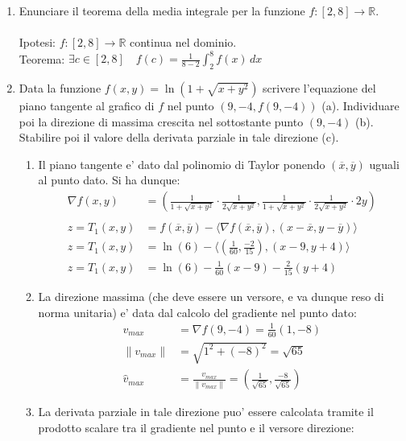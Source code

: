 \documentclass{article}
\begin{document}
\begin{enumerate}
  \item Enunciare il teorema della media integrale per la funzione $f: [2, 8] \to \mathbb{R}$. \\ \\
    Ipotesi: $f: [2, 8] \to \mathbb{R}$ continua nel dominio. \\
    Teorema: $\exists c \in [2, 8] \quad f(c) = \frac{1}{8-2} \int_2^8 f(x) \, dx$
  \item Data la funzione $f(x,y) = \ln(1+\sqrt{x+y^2})$ scrivere l'equazione del
    piano tangente al grafico di $f$ nel punto $(9, -4, f(9, -4))$ (a). Individuare
    poi la direzione di massima crescita nel sottostante punto $(9, -4)$ (b). Stabilire
    poi il valore della derivata parziale in tale direzione (c).
    \begin{enumerate}
      \item Il piano tangente e' dato dal polinomio di Taylor ponendo $(\overline{x},
        \overline{y})$ uguali al punto dato. Si ha dunque:
        \begin{align*}
          \nabla f(x,y) &= (\frac{1}{1+\sqrt{x+y^2}} \cdot \frac{1}{2\sqrt{x+y^2}}, \frac{1}{1+\sqrt{x+y^2}} \cdot \frac{1}{2\sqrt{x+y^2}} \cdot 2y) \\ \\
          z = T_1(x, y) &= f(\overline{x}, \overline{y}) - \langle \nabla f(\overline{x},
          \overline{y}), (x-\overline{x}, y-\overline{y}) \rangle \\
          z = T_1(x, y) &= \ln(6) - \langle (\frac{1}{60}, \frac{-2}{15}), (x-9, y+4) \rangle \\
          z = T_1(x, y) &= \ln(6) - \frac{1}{60}(x-9) - \frac{2}{15}(y+4)
        \end{align*}
      \item La direzione massima (che deve essere un versore, e va dunque reso
        di norma unitaria) e' data dal calcolo del gradiente nel punto dato:
        \begin{align*}
          v_{max} &= \nabla f(9, -4) = \frac{1}{60}(1, -8) \\
          \|v_{max}\| &= \sqrt{1^2 + (-8)^2} = \sqrt{65} \\
          \hat v_{max} &= \frac{v_{max}}{\|v_{max}\|} = (\frac{1}{\sqrt{65}}, \frac{-8}{\sqrt{65}})
        \end{align*}
      \item La derivata parziale in tale direzione puo' essere calcolata tramite
        il prodotto scalare tra il gradiente nel punto e il versore direzione:

\end{enumerate}
\end{enumerate}
\end{document}
